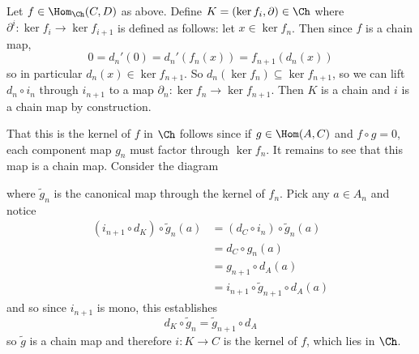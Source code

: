 \documentclass[12pt]{article}
\begin{document}
\begin{sol}
\begin{prf}
	\begin{center}
	\end{center}

	Let $f\in\Hom_{\Ch}(C,D)$ as above. Define $K=(\ker f_i,\partial)\in\Ch$ where 
	$\partial^i:\ker f_i\to \ker f_{i+1}$ is defined as follows: let $x\in\ker f_n$. Then since $f$
	is a chain map, 
	\[0=d_n'(0)=d_n'(f_n(x))=f_{n+1}(d_n(x))\]
	so in particular $d_n(x)\in\ker f_{n+1}$. So $d_n(\ker f_n)\subseteq \ker f_{n+1}$, so we can lift
	$d_n\circ i_n$ through $i_{n+1}$ to a map $\partial_n:\ker f_n\to \ker f_{n+1}$. Then $K$ is a chain 
	and $i$ is a chain map by construction.
	
	That this is the kernel of $f$ in $\Ch$ follows since if $g\in\Hom(A,C)$ and $f\circ g=0$, each component
	map $g_n$ must factor through $\ker f_n$. It remains to see that this map is a chain map. Consider the diagram

	\begin{center}
	\end{center}

	\noindent where $\tilde g_n$ is the canonical map through the kernel of $f_n$. Pick any $a\in A_n$ and notice
	\begin{align*}
		(i_{n+1}\circ d_K)\circ \tilde g_n(a)&=(d_C\circ i_n)\circ \tilde g_n(a) \\
		&= d_C\circ g_n(a)\\
		&=g_{n+1}\circ d_A(a)\\
		&=i_{n+1}\circ \tilde g_{n+1}\circ d_A(a)
	\end{align*}
	and so since $i_{n+1}$ is mono, this establishes
	\[d_K\circ\tilde g_n = \tilde g_{n+1}\circ d_A\]
	so $\tilde g$ is a chain map and therefore $i:K\to C$ is the kernel of $f$, which lies in $\Ch$.
	\end{prf}


\end{sol}
\end{document}
